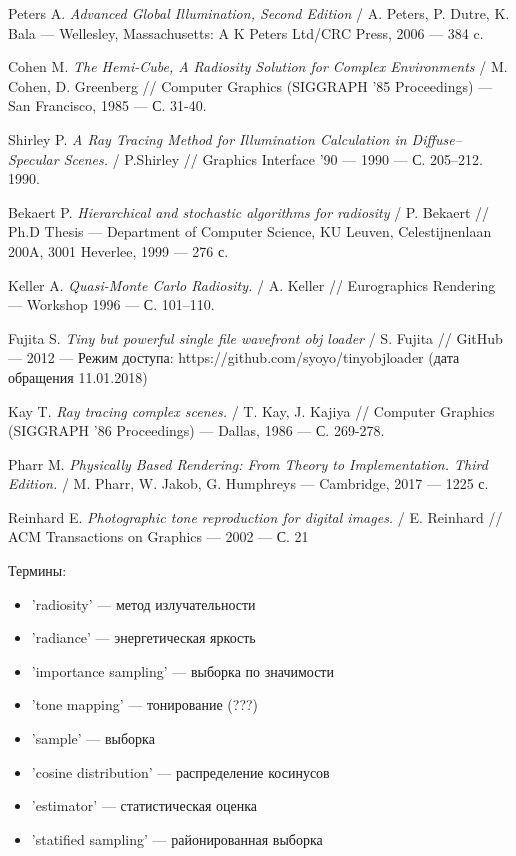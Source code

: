 \documentclass[12pt]{article}
\begin{document}
\begin{thebibliography}{9}
Peters A.
\textit{Advanced Global Illumination, Second Edition} /
A. Peters, P. Dutre, K. Bala
--- Wellesley, Massachusetts: A K Peters Ltd/CRC Press, 2006 --- 384 c.

Cohen M.
\textit{The Hemi-Cube, A Radiosity Solution for Complex Environments} /
M. Cohen, D. Greenberg //
Computer Graphics (SIGGRAPH ’85 Proceedings) --- San Francisco, 1985 --- С. 31-40.

Shirley P.
\textit{A Ray Tracing Method for Illumination Calculation in Diffuse–Specular Scenes.} /
P.Shirley //
Graphics Interface '90 --- 1990 --- С. 205–212.
1990.

Bekaert P.
\textit{Hierarchical and stochastic algorithms for radiosity} /
P. Bekaert //
Ph.D Thesis --- Department of Computer Science, KU Leuven, Celestijnenlaan 200A, 3001 Heverlee, 1999 --- 276 с.

Keller  A.
\textit{Quasi-Monte Carlo Radiosity.} /
A. Keller //
Eurographics Rendering --- Workshop 1996 --- С. 101–110.

Fujita S.
\textit{Tiny but powerful single file wavefront obj loader} /
S. Fujita //
GitHub --- 2012 --- Режим доступа: https://github.com/syoyo/tinyobjloader (дата обращения 11.01.2018)

Kay T.
\textit{Ray tracing complex scenes.} /
T. Kay, J. Kajiya //
Computer Graphics (SIGGRAPH ’86 Proceedings) --- Dallas, 1986 --- С. 269-278.

Pharr M.
\textit{Physically Based Rendering: From Theory to Implementation. Third Edition.} /
M. Pharr, W. Jakob, G. Humphreys --- Cambridge, 2017 --- 1225 с.

Reinhard E.
\textit{Photographic tone reproduction for digital images.} /
E. Reinhard //
ACM Transactions on Graphics --- 2002 --- С. 21
\end{thebibliography}
\newpage
Термины:

\begin{itemize}
\item[] 'radiosity' --- метод излучательности
\item[] 'radiance' --- энергетическая яркость
\item[] 'importance sampling' --- выборка по значимости
\item[] 'tone mapping' --- тонирование (???)
\item[] 'sample' --- выборка
\item[] 'cosine distribution' --- распределение косинусов
\item[] 'estimator' --- статистическая оценка
\item[] 'statified sampling' --- районированная выборка
\end{itemize}
\end{document}
